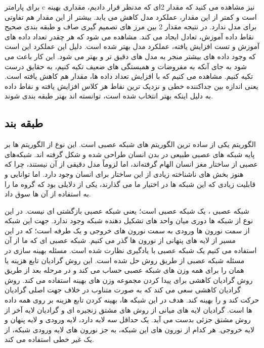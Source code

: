 \documentclass[12pt,onecolumn,a4paper]{article}
\begin{document}
برای پارامتر c نیز مشاهده می کنید که مقدار 2ای که مدنظر قرار دادیم، مقداری بهینه است و کمتر از این مقدار، عملکرد مدل کاهش می یابد. بیشتر از این مقدار هم تفاوتی برای مدل ندارد. در نتیجه مقدار 2 بین مرز های تصمیم گیری صاف و طبقه بندی صحیح نقاط داده آموزش، تعادل ایجاد می کند. مشاهده می شود که هر چقدر تعداد داده های آموزش و تست افزایش یافته، عملکرد مدل بهتر شده است. دلیل این عملکرد این است که وجود داده های بیشتر منجر به مدل های دقیق تر و بهتر می شود. این کار باعث می شود به جای آنکه به مفروضات و همبستگی های ضعیف تکیه کنیم، به حقایق درست تکیه کنیم. مشاهده می کنیم که با افزایش تعداد داده ها، مقدار  هم کاهش یافته است. یعنی اندازه  بین جداکننده خطی و نزدیک ترین نقاط هر کلاس افزایش یافته و نقاط داده به دلیل اینکه  بهتر انتخاب شده است، توانسته اند بهتر طبقه بندی شوند.


\subsection{طبقه بند }
الگوریتم  یکی از ساده ترین الگوریتم های شبکه عصبی است. این نوع از الگوریتم ها بر پایه شبکه های عصبی طبیعی در بدن انسان طراحی شده و شکل گرفته اند.
شبکه‌های عصبی از ساختار مغز انسان الهام گرفته‌اند، اما لزوماً مدل دقیقی از آن نیستند، چرا که هنوز بخش های ناشناخته زیادی از این ساختار برای انسان وجود دارد. اما توانایی و قابلیت زیادی که این شبکه ها در اختیار ما می گذارند، یکی از دلایلی بود که گروه ما را به استفاده از آن ها سوق داد. 

شبکه عصبی ، یک شبکه عصبی  است؛ یعنی شبکه عصبی بازگشتی ای نیست. در این نوع از شبکه ها دوری میان واحد های تشکیل دهنده شبکه وجود ندارد. جهت این شبکه از سمت نورون ها ورودی به سمت نورون های خروجی و یک طرفه است؛ که در این مسیر از لایه های پنهانی از نورون ها گذر می کنیم. شبکه عصبی ای که ما از آن استفاده می کنیم یک شبکه عصبی با یادگیری نظارت شده است. مسئله بهینه سازی  در مسئله شبکه عصبی از طریق روش  حل شده است. این روش گرادیان تابع هزینه یا همان  را برای همه وزن های شبکه عصبی حساب می کند و در مرحله بعد از طریق روش گرادیان کاهشی برای پیدا کردن مجموعه وزن های بهینه استفاده می کند. روش گرادیان کاهشی سعی می کند که به صورت متناوب در خلاف جهت اصلی گرادیان حرکت کند و  را بهینه کند. هدف در این شبکه ها، بهینه کردن تابع هزینه بر روی همه داده ها است.  گرادیان لایه های میانی از روش های مشتق زنجیره ای و گرادیان لایه آخر از روش مشتق جزئی بدست می آید. یک  حداقل سه لایه دارد، لایه ورودی و لایه پنهان و لایه خروجی. هر کدام از نورون های این شبکه، به جز نورون های لایه ورودی شبکه، از یک  غیر خطی استفاده می کند.
\end{document}
